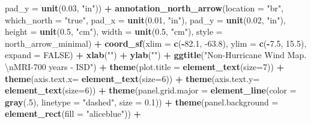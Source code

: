 \documentclass[12pt,twoside]{reedthesis}
\newenvironment{Shaded}{\begin{snugshade}}{\end{snugshade}}
\newcommand{\CharTok}[1]{\textcolor[rgb]{0.31,0.60,0.02}{#1}}
\newcommand{\DataTypeTok}[1]{\textcolor[rgb]{0.13,0.29,0.53}{#1}}
\newcommand{\DecValTok}[1]{\textcolor[rgb]{0.00,0.00,0.81}{#1}}
\newcommand{\FloatTok}[1]{\textcolor[rgb]{0.00,0.00,0.81}{#1}}
\newcommand{\KeywordTok}[1]{\textcolor[rgb]{0.13,0.29,0.53}{\textbf{#1}}}
\newcommand{\NormalTok}[1]{#1}
\newcommand{\OperatorTok}[1]{\textcolor[rgb]{0.81,0.36,0.00}{\textbf{#1}}}
\newcommand{\OtherTok}[1]{\textcolor[rgb]{0.56,0.35,0.01}{#1}}
\newcommand{\StringTok}[1]{\textcolor[rgb]{0.31,0.60,0.02}{#1}}
\begin{document}
\begin{Shaded}
\begin{Highlighting}[]
   \DataTypeTok{pad_y =} \KeywordTok{unit}\NormalTok{(}\FloatTok{0.03}\NormalTok{, }\StringTok{"in"}\NormalTok{)) }\OperatorTok{+}\StringTok{ }
\StringTok{  }\KeywordTok{annotation_north_arrow}\NormalTok{(}\DataTypeTok{location =} \StringTok{"br"}\NormalTok{, }\DataTypeTok{which_north =} \StringTok{"true"}\NormalTok{, }\DataTypeTok{pad_x =} \KeywordTok{unit}\NormalTok{(}\FloatTok{0.01}\NormalTok{, }\StringTok{"in"}\NormalTok{), }\DataTypeTok{pad_y =} \KeywordTok{unit}\NormalTok{(}\FloatTok{0.02}\NormalTok{, }\StringTok{"in"}\NormalTok{), }\DataTypeTok{height =} \KeywordTok{unit}\NormalTok{(}\FloatTok{0.5}\NormalTok{, }\StringTok{"cm"}\NormalTok{), }
   \DataTypeTok{width =} \KeywordTok{unit}\NormalTok{(}\FloatTok{0.5}\NormalTok{, }\StringTok{"cm"}\NormalTok{), }\DataTypeTok{style =}\NormalTok{ north_arrow_minimal) }\OperatorTok{+}
\StringTok{  }\KeywordTok{coord_sf}\NormalTok{(}\DataTypeTok{xlim =} \KeywordTok{c}\NormalTok{(}\OperatorTok{-}\FloatTok{82.1}\NormalTok{, }\FloatTok{-63.8}\NormalTok{), }\DataTypeTok{ylim =} \KeywordTok{c}\NormalTok{(}\OperatorTok{-}\FloatTok{7.5}\NormalTok{, }\FloatTok{15.5}\NormalTok{), }\DataTypeTok{expand =} \OtherTok{FALSE}\NormalTok{) }\OperatorTok{+}
\StringTok{  }\KeywordTok{xlab}\NormalTok{(}\StringTok{""}\NormalTok{) }\OperatorTok{+}\StringTok{ }
\StringTok{  }\KeywordTok{ylab}\NormalTok{(}\StringTok{""}\NormalTok{) }\OperatorTok{+}\StringTok{ }
\StringTok{  }\KeywordTok{ggtitle}\NormalTok{(}\StringTok{"Non-Hurricane Wind Map. }\CharTok{\textbackslash{}n}\StringTok{MRI-700 years - ISD"}\NormalTok{) }\OperatorTok{+}\StringTok{ }
\StringTok{  }\KeywordTok{theme}\NormalTok{(}\DataTypeTok{plot.title =} \KeywordTok{element_text}\NormalTok{(}\DataTypeTok{size=}\DecValTok{7}\NormalTok{)) }\OperatorTok{+}
\StringTok{  }\KeywordTok{theme}\NormalTok{(}\DataTypeTok{axis.text.x=} \KeywordTok{element_text}\NormalTok{(}\DataTypeTok{size=}\DecValTok{6}\NormalTok{)) }\OperatorTok{+}\StringTok{ }
\StringTok{  }\KeywordTok{theme}\NormalTok{(}\DataTypeTok{axis.text.y=} \KeywordTok{element_text}\NormalTok{(}\DataTypeTok{size=}\DecValTok{6}\NormalTok{)) }\OperatorTok{+}
\StringTok{  }\KeywordTok{theme}\NormalTok{(}\DataTypeTok{panel.grid.major =} \KeywordTok{element_line}\NormalTok{(}\DataTypeTok{color =} \KeywordTok{gray}\NormalTok{(.}\DecValTok{5}\NormalTok{), }\DataTypeTok{linetype =} \StringTok{"dashed"}\NormalTok{, }\DataTypeTok{size =} \FloatTok{0.1}\NormalTok{)) }\OperatorTok{+}
\StringTok{  }\KeywordTok{theme}\NormalTok{(}\DataTypeTok{panel.background =} \KeywordTok{element_rect}\NormalTok{(}\DataTypeTok{fill =} \StringTok{"aliceblue"}\NormalTok{)) }\OperatorTok{+}

\end{Highlighting}
\end{Shaded}
\end{document}
